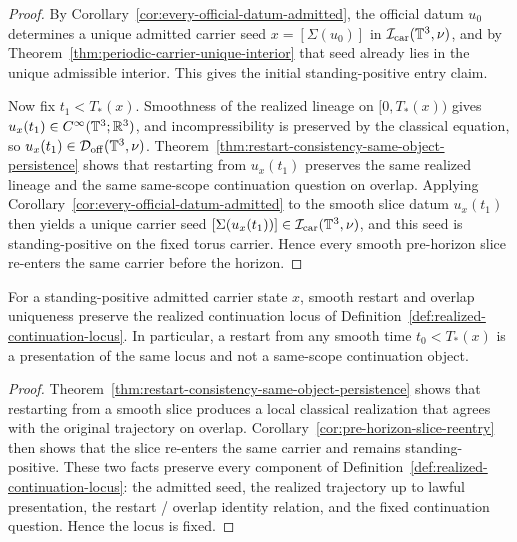 \begin{proof}
By Corollary~\ref{cor:every-official-datum-admitted}, the official datum $u_0$ determines a unique admitted carrier seed $x=[\Sigma(u_0)]$ in $\mathcal I_{\mathrm{car}}(\mathbb{T}^3,\nu)$, and by Theorem~\ref{thm:periodic-carrier-unique-interior} that seed already lies in the unique admissible interior. This gives the initial standing-positive entry claim.

Now fix $t_1<T_*(x)$. Smoothness of the realized lineage on $[0,T_*(x))$ gives $u_x(t_1)\in C^\infty(\mathbb{T}^3;\mathbb{R}^3)$, and incompressibility is preserved by the classical equation, so $u_x(t_1)\in\mathcal D_{\mathrm{off}}(\mathbb{T}^3,\nu)$. Theorem~\ref{thm:restart-consistency-same-object-persistence} shows that restarting from $u_x(t_1)$ preserves the same realized lineage and the same same-scope continuation question on overlap. Applying Corollary~\ref{cor:every-official-datum-admitted} to the smooth slice datum $u_x(t_1)$ then yields a unique carrier seed $[\Sigma(u_x(t_1))]\in\mathcal I_{\mathrm{car}}(\mathbb{T}^3,\nu)$, and this seed is standing-positive on the fixed torus carrier. Hence every smooth pre-horizon slice re-enters the same carrier before the horizon.
\end{proof}


\begin{manuallemma}
\label{lem:continuation-locus-fixity}
For a standing-positive admitted carrier state $x$, smooth restart and overlap uniqueness preserve the realized continuation locus of Definition~\ref{def:realized-continuation-locus}. In particular, a restart from any smooth time $t_0<T_*(x)$ is a presentation of the same locus and not a same-scope continuation object.
\end{manuallemma}

\begin{proof}
Theorem~\ref{thm:restart-consistency-same-object-persistence} shows that restarting from a smooth slice produces a local classical realization that agrees with the original trajectory on overlap. Corollary~\ref{cor:pre-horizon-slice-reentry} then shows that the slice re-enters the same carrier and remains standing-positive. These two facts preserve every component of Definition~\ref{def:realized-continuation-locus}: the admitted seed, the realized trajectory up to lawful presentation, the restart / overlap identity relation, and the fixed continuation question. Hence the locus is fixed.
\end{proof}

